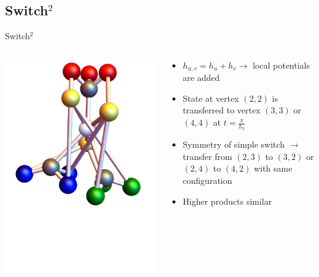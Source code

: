 \documentclass{beamer}
\begin{document}
\subsection{Switch$^2$}
\begin{frame}{Switch$^2$}
	\begin{columns}[T]
		\begin{column}{0.5\textwidth}
			\centering
   			\includegraphics[trim=0mm 0 0 0mm, width=1.2\textwidth]{Images/switch_square}
		\end{column}
		\begin{column}{0.5\textwidth}
			\centering
    		\begin{itemize}
    			\item $h_{u,v} = h_u + h_v \rightarrow $ local potentials are added
    			\item State at vertex $(2,2)$ is transferred to vertex $(3,3)$ or $(4,4)$ at $t = \frac{\pi}{h_2}$
    			\item Symmetry of simple switch $\rightarrow$ transfer from $(2,3)$ to $(3,2)$ or $(2,4)$ to $(4,2)$ with same configuration
    			\item Higher products similar
    		\end{itemize}
		\end{column}
	\end{columns}
\end{frame}
\end{document}
